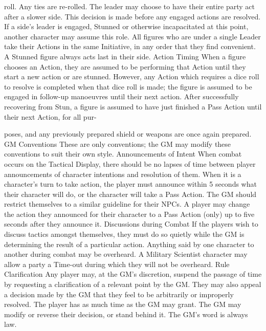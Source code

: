 \documentclass[a4paper]{article}
\begin{document}
\begin{multicols}{3}
roll. Any ties are re-rolled. The leader may choose
to have their entire party act after a slower side.
This decision is made before any engaged actions
are resolved. If a side’s leader is engaged, Stunned
or otherwise incapacitated at this point, another
character may assume this role. All figures who are
under a single Leader take their Actions in the
same Initiative, in any order that they find convenient. A Stunned figure always acts last in their side.
Action Timing
When a figure chooses an Action, they are assumed to be performing that Action until they start
a new action or are stunned. However, any Action
which requires a dice roll to resolve is completed
when that dice roll is made; the figure is assumed
to be engaged in follow-up manoeuvres until their
next action. After successfully recovering from
Stun, a figure is assumed to have just finished a
Pass Action until their next Action, for all pur-

poses, and any previously prepared shield or weapons are once again prepared.
GM Conventions
These are only conventions; the GM may modify
these conventions to suit their own style.
Announcements of Intent When combat occurs
on the Tactical Display, there should be no lapses
of time between player announcements of character
intentions and resolution of them. When it is a
character’s turn to take action, the player must
announce within 5 seconds what their character
will do, or the character will take a Pass Action.
The GM should restrict themselves to a similar
guideline for their NPCs. A player may change the
action they announced for their character to a Pass
Action (only) up to five seconds after they announce it.
Discussions during Combat If the players wish to
discuss tactics amongst themselves, they must do
so quietly while the GM is determining the result
of a particular action. Anything said by one character to another during combat may be overheard. A
Military Scientist character may allow a party a
Time-out during which they will not be overheard.
Rule Clarification Any player may, at the GM’s
discretion, suspend the passage of time by requesting a clarification of a relevant point by the GM.
They may also appeal a decision made by the GM
that they feel to be arbitrarily or improperly resolved. The player has as much time as the GM
may grant. The GM may modify or reverse their
decision, or stand behind it. The GM’s word is
always law.


\end{multicols}
\end{document}
